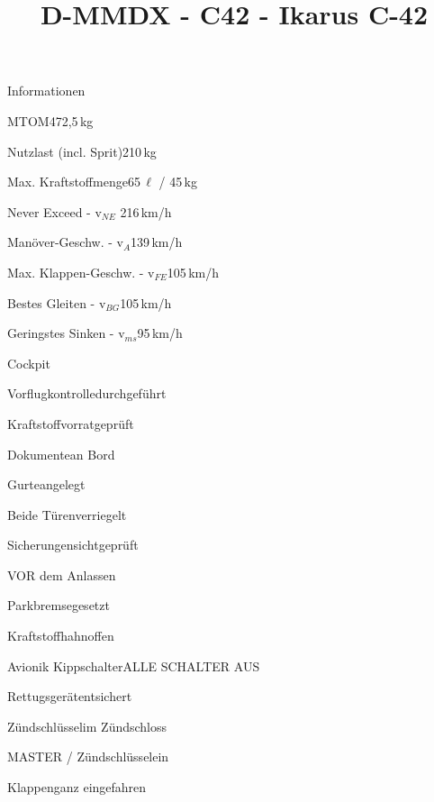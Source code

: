 \def\papersize{4}




\title{D-MMDX  -  C42  -  Ikarus C-42}

\begin{checklist}{Informationen}
 	\item{MTOM}{472,5\,kg}
  	\item{Nutzlast (incl. Sprit)}{210\,kg}
  	\item{Max. Kraftstoffmenge}{65\,${\ell}$ / 45\,kg}
 	  \item{Never Exceed  -  v$_{NE}$ }{216\,km/h}
	  \item{Manöver-Geschw.  -  v$_{A}$}{139\,km/h}
	  \item{Max. Klappen-Geschw.  -  v$_{FE}$}{105\,km/h}
	  \item{Bestes Gleiten  -  v$_{BG}$}{105\,km/h}
	  \item{Geringstes Sinken  -  v$_{ms}$}{95\,km/h}
\end{checklist}

\begin{checklist}{Cockpit}
	\item{Vorflugkontrolle}{durchgeführt}
	\item{Kraftstoffvorrat}{geprüft}
	\item{Dokumente}{an Bord}
	\item{Gurte}{angelegt}
	\item{Beide Türen}{verriegelt}
	\item{Sicherungen}{sichtgeprüft}
\end{checklist}

\begin{checklist}{VOR dem Anlassen}
	\item{Parkbremse}{gesetzt}
	\item{Kraftstoffhahn}{offen}
	\item{Avionik Kippschalter}{ALLE SCHALTER AUS}
	\item{Rettugsgerät}{entsichert}
	\item{Zündschlüssel}{im Zündschloss}
	\item{MASTER / Zündschlüssel}{ein}
	\item{Klappen}{ganz eingefahren}
\end{checklist}

